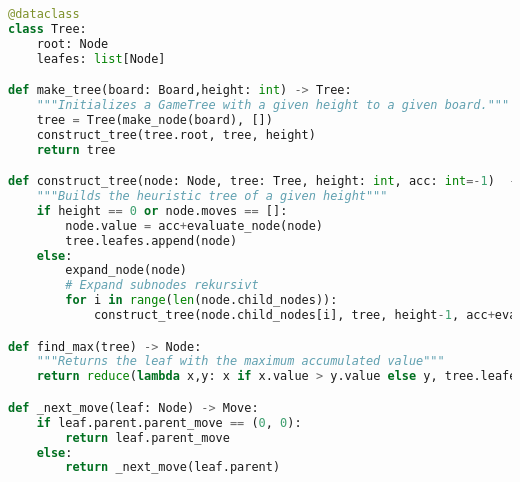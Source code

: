 \begin{lstlisting}[language=Python, caption={Tree}, label={code:tree}]
@dataclass
class Tree:
    root: Node
    leafes: list[Node]

def make_tree(board: Board,height: int) -> Tree:
    """Initializes a GameTree with a given height to a given board."""
    tree = Tree(make_node(board), [])
    construct_tree(tree.root, tree, height)
    return tree

def construct_tree(node: Node, tree: Tree, height: int, acc: int=-1)  -> None:
    """Builds the heuristic tree of a given height"""
    if height == 0 or node.moves == []:
        node.value = acc+evaluate_node(node)
        tree.leafes.append(node)
    else:
        expand_node(node)
        # Expand subnodes rekursivt
        for i in range(len(node.child_nodes)):
            construct_tree(node.child_nodes[i], tree, height-1, acc+evaluate_node(node.child_nodes[i]))

def find_max(tree) -> Node:
    """Returns the leaf with the maximum accumulated value"""
    return reduce(lambda x,y: x if x.value > y.value else y, tree.leafes)

def _next_move(leaf: Node) -> Move:
    if leaf.parent.parent_move == (0, 0):
        return leaf.parent_move
    else:
        return _next_move(leaf.parent)
\end{lstlisting}